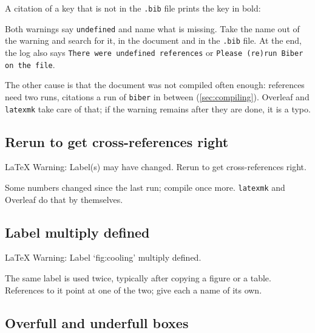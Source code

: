 
A citation of a key that is not in the \texttt{.bib} file prints the key in bold:


Both warnings say \texttt{undefined} and name what is missing.
Take the name out of the warning and search for it, in the document and in the \texttt{.bib} file.
At the end, the log also says
\texttt{There were undefined references} or \texttt{Please (re)run Biber on the file}.

The other cause is that the document was not compiled often enough:
references need two runs, citations a run of \texttt{biber} in between (\autoref{sec:compiling}).
Overleaf and \texttt{latexmk} take care of that;
if the warning remains after they are done, it is a typo.

\subsection{Rerun to get cross-references right}

\begin{codeblock}[style=shell]
LaTeX Warning: Label(s) may have changed. Rerun to get cross-references right.
\end{codeblock}

Some numbers changed since the last run; compile once more.
\texttt{latexmk} and Overleaf do that by themselves.

\subsection{Label multiply defined}

\begin{codeblock}[style=shell]
LaTeX Warning: Label `fig:cooling' multiply defined.
\end{codeblock}

The same label is used twice, typically after copying a figure or a table.
References to it point at one of the two; give each a name of its own.

\subsection{Overfull and underfull boxes}


